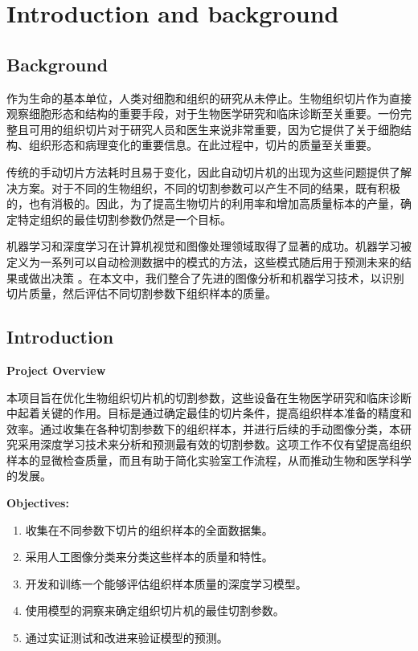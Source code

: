 \section{Introduction and background}
\label{sec:introduction}

\subsection{Background}

作为生命的基本单位，人类对细胞和组织的研究从未停止。生物组织切片作为直接观察细胞形态和结构的重要手段，对于生物医学研究和临床诊断至关重要。一份完整且可用的组织切片对于研究人员和医生来说非常重要，因为它提供了关于细胞结构、组织形态和病理变化的重要信息。在此过程中，切片的质量至关重要。

传统的手动切片方法耗时且易于变化，因此自动切片机的出现为这些问题提供了解决方案。对于不同的生物组织，不同的切割参数可以产生不同的结果，既有积极的，也有消极的。因此，为了提高生物切片的利用率和增加高质量标本的产量，确定特定组织的最佳切割参数仍然是一个目标。

机器学习和深度学习在计算机视觉和图像处理领域取得了显著的成功。机器学习被定义为一系列可以自动检测数据中的模式的方法，这些模式随后用于预测未来的结果或做出决策 \cite{1.1}。在本文中，我们整合了先进的图像分析和机器学习技术，以识别切片质量，然后评估不同切割参数下组织样本的质量。

\subsection{Introduction}

\textbf{Project Overview}

本项目旨在优化生物组织切片机的切割参数，这些设备在生物医学研究和临床诊断中起着关键的作用。目标是通过确定最佳的切片条件，提高组织样本准备的精度和效率。通过收集在各种切割参数下的组织样本，并进行后续的手动图像分类，本研究采用深度学习技术来分析和预测最有效的切割参数。这项工作不仅有望提高组织样本的显微检查质量，而且有助于简化实验室工作流程，从而推动生物和医学科学的发展。


\textbf{Objectives:}

\begin{enumerate} 
    \item 收集在不同参数下切片的组织样本的全面数据集。 
    \item 采用人工图像分类来分类这些样本的质量和特性。 
    \item 开发和训练一个能够评估组织样本质量的深度学习模型。 
    \item 使用模型的洞察来确定组织切片机的最佳切割参数。 
    \item 通过实证测试和改进来验证模型的预测。 
\end{enumerate}

